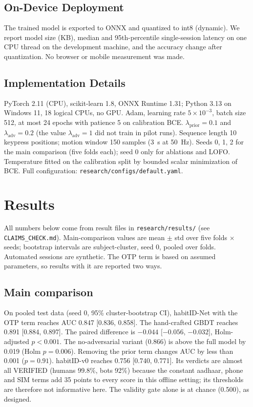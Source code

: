 \documentclass[conference]{IEEEtran}
\begin{document}
\subsection{On-Device Deployment}
The trained model is exported to ONNX and quantized to int8 (dynamic). We report model size (KB), median and 95th-percentile single-session latency on one CPU thread on the development machine, and the accuracy change after quantization. No browser or mobile measurement was made.

\subsection{Implementation Details}
PyTorch 2.11 (CPU), scikit-learn 1.8, ONNX Runtime 1.31; Python 3.13 on Windows 11, 18 logical CPUs, no GPU. Adam, learning rate $5{\times}10^{-3}$, batch size 512, at most 24 epochs with patience 5 on calibration BCE. $\lambda_{\text{prior}}=0.1$ and $\lambda_{\text{adv}}=0.2$ (the value $\lambda_{\text{adv}}=1$ did not train in pilot runs). Sequence length 10 keypress positions; motion window 150 samples (3~s at 50~Hz). Seeds 0, 1, 2 for the main comparison (five folds each); seed 0 only for ablations and LOFO. Temperature fitted on the calibration split by bounded scalar minimization of BCE. Full configuration: \texttt{research/configs/default.yaml}.

\section{Results}
\label{sec:results}
All numbers below come from result files in \texttt{research/results/} (see \texttt{CLAIMS\_CHECK.md}). Main-comparison values are mean $\pm$ std over five folds $\times$ seeds; bootstrap intervals are subject-cluster, seed 0, pooled over folds. Automated sessions are synthetic. The OTP term is based on assumed parameters, so results with it are reported two ways.

\subsection{Main comparison}


On pooled test data (seed 0, 95\% cluster-bootstrap CI), habitID-Net with the OTP term reaches AUC 0.847 [0.836, 0.858]. The hand-crafted GBDT reaches 0.891 [0.884, 0.897]. The paired difference is $-0.044$ [$-0.056$, $-0.032$], Holm-adjusted $p<0.001$. The no-adversarial variant (0.866) is above the full model by 0.019 (Holm $p=0.006$). Removing the prior term changes AUC by less than 0.001 ($p=0.91$). habitID-v0 reaches 0.756 [0.740, 0.771]. Its verdicts are almost all VERIFIED (humans 99.8\%, bots 92\%) because the constant aadhaar, phone and SIM terms add 35 points to every score in this offline setting; its thresholds are therefore not informative here. The validity gate alone is at chance (0.500), as designed.
\end{document}
